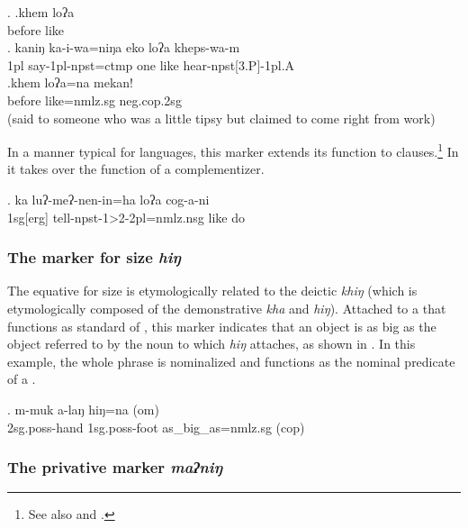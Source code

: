  
  \ex. \ag.khem loʔa\\
 before like\\
 \bg. kaniŋ ka-i-wa=niŋa eko loʔa kheps-wa-m\\
 {\sc 1pl} say{\sc -1pl-npst=ctmp} one like hear{\sc -npst[3.P]-1pl.A}\\
  
  \bg.khem loʔa=na mekan!\\
  before like{\sc =nmlz.sg} {\sc neg.cop.2sg}\\
   (said to someone who was a little tipsy but claimed to come right from work)
  
  In a manner typical for  languages, this marker extends its function to clauses.\footnote{See also \citet{DeLancey1985_Etymological} and \citet{Genetti1991From}.} In \Next it takes over the function of a complementizer.
  
  \exg. ka luʔ-meʔ-nen-in=ha loʔa  cog-a-ni\\
  {\sc 1sg[erg]}  tell{\sc -npst-1>2-2pl=nmlz.nsg} like do\\
   

  
\subsubsection{The  marker for size \emph{hiŋ}}

The equative  for size is etymologically related to the deictic  \emph{khiŋ} (which is etymologically composed of the demonstrative \emph{kha} and \emph{hiŋ}). Attached to a  that functions as standard of , this  marker indicates that an object is as big as the  object referred to by the noun to which \emph{hiŋ} attaches, as shown in \Next. In this example, the whole phrase is nominalized and functions as the nominal predicate of a .

	\exg. m-muk a-laŋ hiŋ=na (om)\\
 {\sc 2sg.poss-}hand {\sc 1sg.poss-}foot 	as\_big\_as{\sc =nmlz.sg} ({\sc cop})	\\

\subsubsection{The privative marker \emph{maʔniŋ}}


